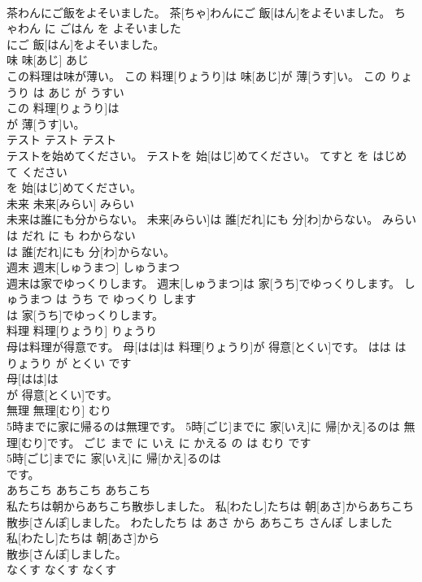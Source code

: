 \documentclass[8pt]{extreport}
\begin{document}
\begin{CJK}{UTF8}{min}
\\	茶わんにご飯をよそいました。	茶[ちゃ]わんにご 飯[はん]をよそいました。	ちゃわん に ごはん を よそいました	
\\	にご 飯[はん]をよそいました。		
\\	味	味[あじ]	あじ	
\\	この料理は味が薄い。	この 料理[りょうり]は 味[あじ]が 薄[うす]い。	この りょうり は あじ が うすい	
\\	この 料理[りょうり]は
\\	が 薄[うす]い。		
\\	テスト	テスト	テスト	
\\	テストを始めてください。	テストを 始[はじ]めてください。	てすと を はじめて ください	
\\	を 始[はじ]めてください。		
\\	未来	未来[みらい]	みらい	
\\	未来は誰にも分からない。	未来[みらい]は 誰[だれ]にも 分[わ]からない。	みらい は だれ に も わからない	
\\	は 誰[だれ]にも 分[わ]からない。		
\\	週末	週末[しゅうまつ]	しゅうまつ	
\\	週末は家でゆっくりします。	週末[しゅうまつ]は 家[うち]でゆっくりします。	しゅうまつ は うち で ゆっくり します	
\\	は 家[うち]でゆっくりします。		
\\	料理	料理[りょうり]	りょうり	
\\	母は料理が得意です。	母[はは]は 料理[りょうり]が 得意[とくい]です。	はは は りょうり が とくい です	
\\	母[はは]は
\\	が 得意[とくい]です。		
\\	無理	無理[むり]	むり	
\\	5時までに家に帰るのは無理です。	5時[ごじ]までに 家[いえ]に 帰[かえ]るのは 無理[むり]です。	ごじ まで に いえ に かえる の は むり です	
\\	5時[ごじ]までに 家[いえ]に 帰[かえ]るのは
\\	です。		
\\	あちこち	あちこち	あちこち	
\\	私たちは朝からあちこち散歩しました。	私[わたし]たちは 朝[あさ]からあちこち 散歩[さんぽ]しました。	わたしたち は あさ から あちこち さんぽ しました	
\\	私[わたし]たちは 朝[あさ]から
\\	散歩[さんぽ]しました。		
\\	なくす	なくす	なくす	

\end{CJK}
\end{document}
